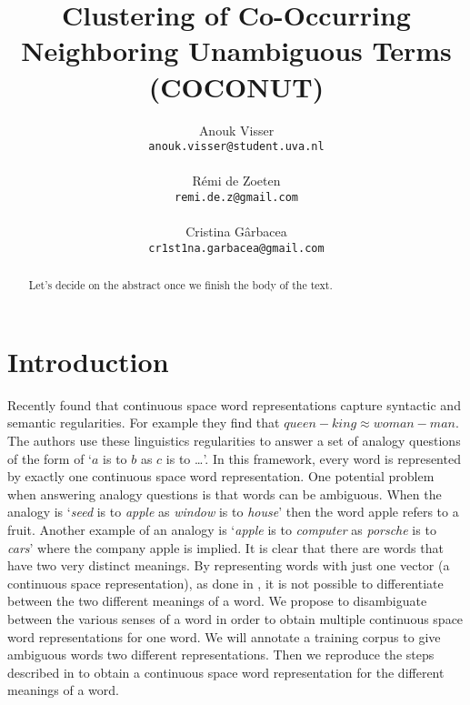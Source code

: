 \documentclass[11pt]{article}
\title{Clustering of Co-Occurring Neighboring Unambiguous Terms (COCONUT)}
\author{
Anouk Visser \\
{\tt anouk.visser@student.uva.nl}\\
  \\\And
  R\'emi de Zoeten \\
  {\tt remi.de.z@gmail.com}\\
   \\\And
  Cristina G\^arbacea \\
  {\tt cr1st1na.garbacea@gmail.com}
  \\}
\date{}
\begin{document}
\maketitle
\begin{abstract}
Let's decide on the abstract once we finish the body of the text.
\end{abstract}

\section{Introduction}
Recently \cite{Mikolov:13} found that continuous space word representations capture syntactic and semantic regularities. For example they find that $\textit{queen} - \textit{king} \approx \textit{woman}  -\textit{man}$. The authors use these linguistics regularities to answer a set of analogy questions of the form of `$a$ is to $b$ as $c$ is to \dots'. In this framework, every word is represented by exactly one continuous space word representation. One potential problem when answering analogy questions is that words can be ambiguous. When the analogy is `\textit{seed} is to \textit{apple} as \textit{window} is to \textit{house}' then the word apple refers to a fruit. Another example of an analogy is `\textit{apple} is to \textit{computer} as \textit{porsche} is to \textit{cars}' where the company apple is implied. It is clear that there are words that have two very distinct meanings. By representing words with just one vector (a continuous space representation), as done in \cite{Mikolov:13}, it is not possible to differentiate between the two different meanings of a word. We propose to disambiguate between the various senses of a word in order to obtain multiple continuous space word representations for one word. We will annotate a training corpus to give ambiguous words two different representations. Then we reproduce the steps described in \cite{Mikolov:13} to obtain a continuous space word representation for the different meanings of a word.
\end{document}
